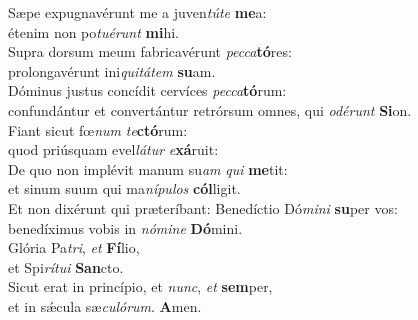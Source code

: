 \evenverse Sæpe expugnavérunt me a juven\textit{tú}\textit{te} \textbf{me}a:~\*\\
\evenverse étenim non po\textit{tu}\textit{é}\textit{runt} \textbf{mi}hi.\\
\oddverse Supra dorsum meum fabricavérunt \textit{pec}\textit{ca}\textbf{tó}res:~\*\\
\oddverse prolongavérunt ini\textit{qui}\textit{tá}\textit{tem} \textbf{su}am.\\
\evenverse Dóminus justus concídit cervíces \textit{pec}\textit{ca}\textbf{tó}rum:~\*\\
\evenverse confundántur et convertántur retrórsum omnes, qui \textit{o}\textit{dé}\textit{runt} \textbf{Si}on.\\
\oddverse Fiant sicut fœ\textit{num} \textit{te}\textbf{ctó}rum:~\*\\
\oddverse quod priúsquam evel\textit{lá}\textit{tur} \textit{e}\textbf{xá}ruit:\\
\evenverse De quo non implévit manum su\textit{am} \textit{qui} \textbf{me}tit:~\*\\
\evenverse et sinum suum qui ma\textit{ní}\textit{pu}\textit{los} \textbf{cól}ligit.\\
\oddverse Et non dixérunt qui præteríbant: Benedíctio Dó\textit{mi}\textit{ni} \textbf{su}per vos:~\*\\
\oddverse benedíximus vobis in \textit{nó}\textit{mi}\textit{ne} \textbf{Dó}mini.\\
\evenverse Glória Pa\textit{tri}, \textit{et} \textbf{Fí}lio,~\*\\
\evenverse et Spi\textit{rí}\textit{tu}\textit{i} \textbf{San}cto.\\
\oddverse Sicut erat in princípio, et \textit{nunc}, \textit{et} \textbf{sem}per,~\*\\
\oddverse et in sǽcula sæ\textit{cu}\textit{ló}\textit{rum}. \textbf{A}men.\\
